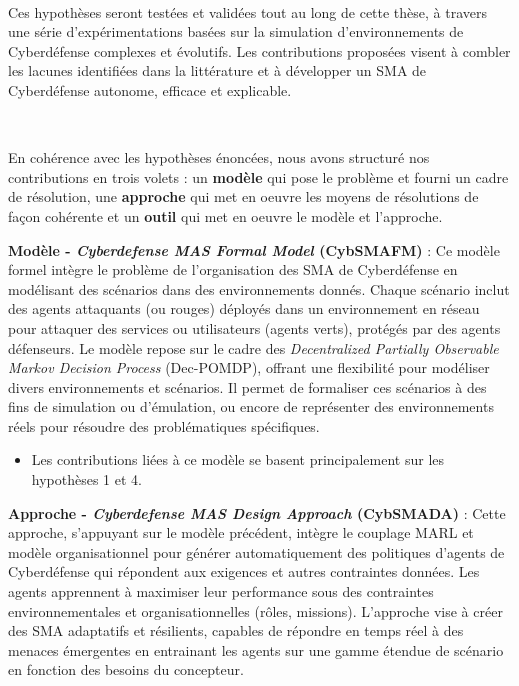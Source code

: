 \

Ces hypothèses seront testées et validées tout au long de cette thèse, à travers une série d'expérimentations basées sur la simulation d'environnements de Cyberdéfense complexes et évolutifs. Les contributions proposées visent à combler les lacunes identifiées dans la littérature et à développer un SMA de Cyberdéfense autonome, efficace et explicable.

\

En cohérence avec les hypothèses énoncées, nous avons structuré nos contributions en trois volets : un \textbf{modèle} qui pose le problème et fourni un cadre de résolution, une \textbf{approche} qui met en oeuvre les moyens de résolutions de façon cohérente et un \textbf{outil} qui met en oeuvre le modèle et l'approche.

\textbf{Modèle - \textit{Cyberdefense MAS Formal Model} (CybSMAFM)} : Ce modèle formel intègre le problème de l'organisation des SMA de Cyberdéfense en modélisant des scénarios dans des environnements donnés. Chaque scénario inclut des agents attaquants (ou rouges) déployés dans un environnement en réseau pour attaquer des services ou utilisateurs (agents verts), protégés par des agents défenseurs. Le modèle repose sur le cadre des \textit{Decentralized Partially Observable Markov Decision Process} (Dec-POMDP), offrant une flexibilité pour modéliser divers environnements et scénarios. Il permet de formaliser ces scénarios à des fins de simulation ou d'émulation, ou encore de représenter des environnements réels pour résoudre des problématiques spécifiques.
\begin{itemize}
    \item Les contributions liées à ce modèle se basent principalement sur les hypothèses 1 et 4.
\end{itemize}

\textbf{Approche - \textit{Cyberdefense MAS Design Approach} (CybSMADA)} : Cette approche, s'appuyant sur le modèle précédent, intègre le couplage MARL et modèle organisationnel pour générer automatiquement des politiques d'agents de Cyberdéfense qui répondent aux exigences et autres contraintes données. Les agents apprennent à maximiser leur performance sous des contraintes environnementales et organisationnelles (rôles, missions). L'approche vise à créer des SMA adaptatifs et résilients, capables de répondre en temps réel à des menaces émergentes en entrainant les agents sur une gamme étendue de scénario en fonction des besoins du concepteur.


